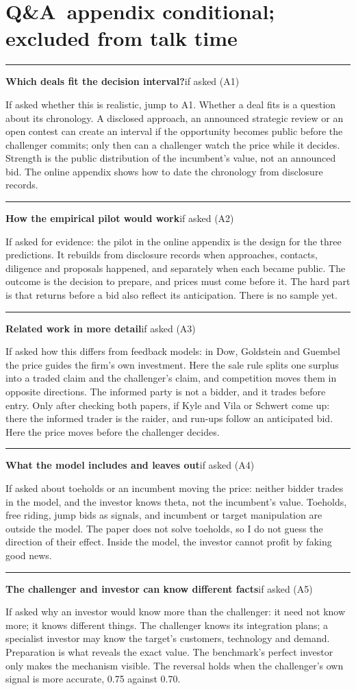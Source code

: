 \documentclass[11pt]{article}
\newcommand{\scriptframe}[3]{%
  \Needspace{9\baselineskip}%
  \par\medskip\noindent\textcolor{ScriptBlue}{\rule{\linewidth}{0.55pt}}%
  \par\smallskip\noindent
  \textbf{#1}\hfill\textcolor{ScriptGray}{\small #2}\par\smallskip
  #3\par}
\newcommand{\ScriptAppendix}{%
  \clearpage
  \section*{\mbox{Q\&A appendix} \hfill
    \normalfont\small\textcolor{ScriptGray}{conditional; excluded from talk time}}}
\begin{document}
\ScriptAppendix

\scriptframe{Which deals fit the decision interval?}{if asked (A1)}{%
  If asked whether this is realistic, jump to A1. Whether a deal fits is a
  question about its chronology. A disclosed approach, an announced strategic
  review or an open contest can create an interval if the opportunity becomes
  public before the challenger commits; only then can a challenger watch the
  price while it decides. Strength is the public distribution of the
  incumbent's value, not an announced bid. The online appendix shows how to
  date the chronology from disclosure records.
}

\scriptframe{How the empirical pilot would work}{if asked (A2)}{%
  If asked for evidence: the pilot in the online appendix is the design for the
  three predictions. It rebuilds from disclosure records when approaches,
  contacts, diligence and proposals happened, and separately when each became
  public. The outcome is the decision to prepare, and prices must come before
  it. The hard part is that returns before a bid also reflect its anticipation.
  There is no sample yet.
}

\scriptframe{Related work in more detail}{if asked (A3)}{%
  If asked how this differs from feedback models: in Dow, Goldstein and Guembel
  the price guides the firm's own investment. Here the sale rule splits one
  surplus into a traded claim and the challenger's claim, and competition moves
  them in opposite directions. The informed party is not a bidder, and it trades
  before entry. Only after checking both papers, if Kyle and Vila or Schwert come
  up: there the informed trader is the raider, and run-ups follow an anticipated
  bid. Here the price moves before the challenger decides.
}

\scriptframe{What the model includes and leaves out}{if asked (A4)}{%
  If asked about toeholds or an incumbent moving the price: neither bidder
  trades in the model, and the investor knows theta, not the incumbent's value.
  Toeholds, free riding, jump bids as signals, and incumbent or target
  manipulation are outside the model. The paper does not solve toeholds, so I
  do not guess the direction of their effect. Inside the model, the investor
  cannot profit by faking good news.
}

\scriptframe{The challenger and investor can know different facts}{if asked (A5)}{%
  If asked why an investor would know more than the challenger: it need not
  know more; it knows different things. The challenger knows its integration
  plans; a specialist investor may know the target's customers, technology and
  demand. Preparation is what reveals the exact value. The benchmark's perfect
  investor only makes the mechanism visible. The reversal holds when the
  challenger's own signal is more accurate, 0.75 against 0.70.
}
\end{document}
